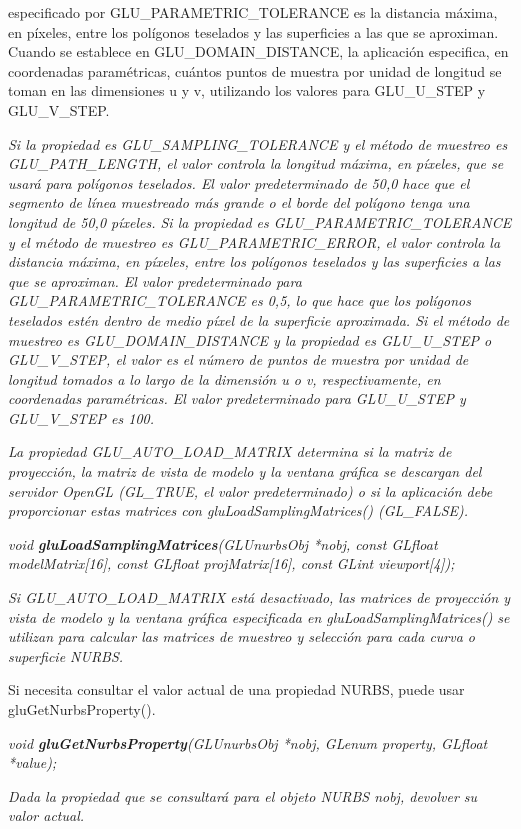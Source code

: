 \documentclass[]{article}
\begin{document}
\begin{description}
\begin{description}
{            especificado por GLU\_PARAMETRIC\_TOLERANCE es la distancia
            máxima, en píxeles, entre los polígonos teselados y las
            superficies a las que se aproximan. Cuando se establece
            en GLU\_DOMAIN\_DISTANCE, la aplicación especifica, en
            coordenadas paramétricas, cuántos puntos de muestra por
            unidad de longitud se toman en las dimensiones u y v,
            utilizando los valores para GLU\_U\_STEP y GLU\_V\_STEP.
        }
        \item \textit{Si la propiedad es GLU\_SAMPLING\_TOLERANCE y el método de muestreo es GLU\_PATH\_LENGTH, el valor controla la longitud máxima, en píxeles, que se usará para polígonos teselados. El valor predeterminado de 50,0 hace que el segmento de línea muestreado más grande o el borde del polígono tenga una longitud de 50,0 píxeles. Si la propiedad es GLU\_PARAMETRIC\_TOLERANCE y el método de muestreo es GLU\_PARAMETRIC\_ERROR, el valor controla la distancia máxima, en píxeles, entre los polígonos teselados y las superficies a las que se aproximan. El valor predeterminado para GLU\_PARAMETRIC\_TOLERANCE es 0,5, lo que hace que los polígonos teselados estén dentro de medio píxel de la superficie aproximada. Si el método de muestreo es GLU\_DOMAIN\_DISTANCE y la propiedad es GLU\_U\_STEP o GLU\_V\_STEP, el valor es el número de puntos de muestra por unidad de longitud tomados a lo largo de la dimensión u o v, respectivamente, en coordenadas paramétricas. El valor predeterminado para GLU\_U\_STEP y GLU\_V\_STEP es 100.
        }
        \item \textit{La propiedad GLU\_AUTO\_LOAD\_MATRIX determina si la matriz de proyección, la matriz de vista de modelo y la ventana gráfica se descargan del servidor OpenGL (GL\_TRUE, el valor predeterminado) o si la aplicación debe proporcionar estas matrices con gluLoadSamplingMatrices() (GL\_FALSE).
        }
    \end{description}
    \item \emph{void \textbf{gluLoadSamplingMatrices}(GLUnurbsObj *nobj, const GLfloat modelMatrix[16], const GLfloat projMatrix[16], const GLint viewport[4]);}
        \begin{description}
            \item \textit{Si GLU\_AUTO\_LOAD\_MATRIX está desactivado, las matrices de proyección y vista de modelo y la ventana gráfica especificada en gluLoadSamplingMatrices() se utilizan para calcular las matrices de muestreo y selección para cada curva o superficie NURBS.}
        \end{description}
    \item Si necesita consultar el valor actual de una propiedad NURBS, puede usar gluGetNurbsProperty().
    \item \emph{void \textbf{gluGetNurbsProperty}(GLUnurbsObj *nobj, GLenum property, GLfloat *value);}
        \begin{description}
            \item \textit{Dada la propiedad que se consultará para el objeto NURBS nobj, devolver su valor actual.}
        \end{description}
\end{description}
\end{document}

